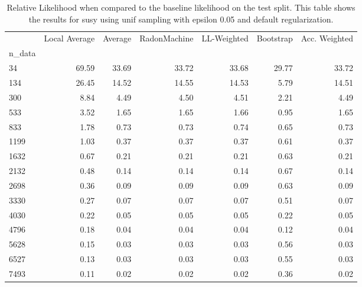 \begin{table}
\centering
\caption{Relative Likelihood when compared to the baseline likelihood on the test split. This table shows the results for  susy using  unif sampling with epsilon  0.05 and  default regularization.}
\label{tab:5}
\begin{tabular}{lrrrrrr}
\toprule
{} &  Local Average &  Average &  RadonMachine &  LL-Weighted &  Bootstrap &  Acc. Weighted \\
n\_data &                &          &               &              &            &                \\
\midrule
34     &          69.59 &    33.69 &         33.72 &        33.68 &      29.77 &          33.72 \\
134    &          26.45 &    14.52 &         14.55 &        14.53 &       5.79 &          14.51 \\
300    &           8.84 &     4.49 &          4.50 &         4.51 &       2.21 &           4.49 \\
533    &           3.52 &     1.65 &          1.65 &         1.66 &       0.95 &           1.65 \\
833    &           1.78 &     0.73 &          0.73 &         0.74 &       0.65 &           0.73 \\
1199   &           1.03 &     0.37 &          0.37 &         0.37 &       0.61 &           0.37 \\
1632   &           0.67 &     0.21 &          0.21 &         0.21 &       0.63 &           0.21 \\
2132   &           0.48 &     0.14 &          0.14 &         0.14 &       0.67 &           0.14 \\
2698   &           0.36 &     0.09 &          0.09 &         0.09 &       0.63 &           0.09 \\
3330   &           0.27 &     0.07 &          0.07 &         0.07 &       0.51 &           0.07 \\
4030   &           0.22 &     0.05 &          0.05 &         0.05 &       0.22 &           0.05 \\
4796   &           0.18 &     0.04 &          0.04 &         0.04 &       0.12 &           0.04 \\
5628   &           0.15 &     0.03 &          0.03 &         0.03 &       0.56 &           0.03 \\
6527   &           0.13 &     0.03 &          0.03 &         0.03 &       0.55 &           0.03 \\
7493   &           0.11 &     0.02 &          0.02 &         0.02 &       0.36 &           0.02 \\
\bottomrule
\end{tabular}
\end{table}
